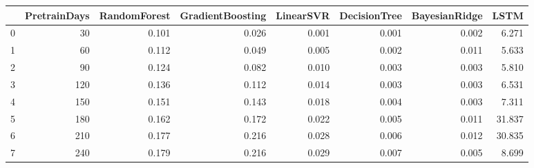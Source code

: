 \begin{tabular}{lrrrrrrr}
\toprule
{} &  PretrainDays &  RandomForest &  GradientBoosting &  LinearSVR &  DecisionTree &  BayesianRidge &   LSTM \\
\midrule
0 &            30 &         0.101 &             0.026 &      0.001 &         0.001 &          0.002 &  6.271 \\
1 &            60 &         0.112 &             0.049 &      0.005 &         0.002 &          0.011 &  5.633 \\
2 &            90 &         0.124 &             0.082 &      0.010 &         0.003 &          0.003 &  5.810 \\
3 &           120 &         0.136 &             0.112 &      0.014 &         0.003 &          0.003 &  6.531 \\
4 &           150 &         0.151 &             0.143 &      0.018 &         0.004 &          0.003 &  7.311 \\
5 &           180 &         0.162 &             0.172 &      0.022 &         0.005 &          0.011 & 31.837 \\
6 &           210 &         0.177 &             0.216 &      0.028 &         0.006 &          0.012 & 30.835 \\
7 &           240 &         0.179 &             0.216 &      0.029 &         0.007 &          0.005 &  8.699 \\
\bottomrule
\end{tabular}
